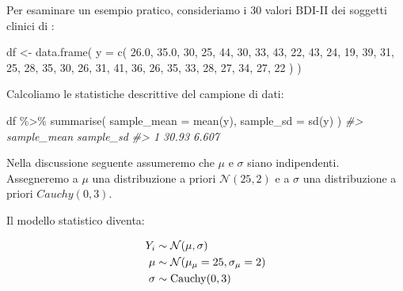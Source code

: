 \documentclass[
  11pt,
]{krantz}
\makeatletter
\newenvironment{Shaded}{\begin{snugshade}}{\end{snugshade}}
\newcommand{\AttributeTok}[1]{\textcolor[rgb]{0.61,0.61,0.61}{#1}}
\newcommand{\CommentTok}[1]{\textcolor[rgb]{0.37,0.37,0.37}{\textit{#1}}}
\newcommand{\DecValTok}[1]{\textcolor[rgb]{0.06,0.06,0.06}{#1}}
\newcommand{\FloatTok}[1]{\textcolor[rgb]{0.06,0.06,0.06}{#1}}
\newcommand{\FunctionTok}[1]{\textcolor[rgb]{0,0,0}{#1}}
\newcommand{\NormalTok}[1]{#1}
\newcommand{\OtherTok}[1]{\textcolor[rgb]{0.37,0.37,0.37}{#1}}
\newcommand{\SpecialCharTok}[1]{\textcolor[rgb]{0,0,0}{#1}}
\newenvironment{kframe}{%
\medskip{}
\setlength{\fboxsep}{.8em}
 \def\at@end@of@kframe{}%
 \ifinner\ifhmode%
  \def\at@end@of@kframe{\end{minipage}}%
  \begin{minipage}{\columnwidth}%
 \fi\fi%
 \def\FrameCommand##1{\hskip\@totalleftmargin \hskip-\fboxsep
 \colorbox{shadecolor}{##1}\hskip-\fboxsep
     \hskip-\linewidth \hskip-\@totalleftmargin \hskip\columnwidth}%
 \MakeFramed {\advance\hsize-\width
   \@totalleftmargin\z@ \linewidth\hsize
   \@setminipage}}%
 {\par\unskip\endMakeFramed%
 \at@end@of@kframe}
\renewenvironment{Shaded}{\begin{kframe}}{\end{kframe}}
\DeclareMathOperator{\Cauchy}{Cauchy} %
\theoremstyle{definition}
\theoremstyle{definition}
\theoremstyle{definition}
\theoremstyle{definition}
\theoremstyle{remark}
\makeatother
\begin{document}
Per esaminare un esempio pratico, consideriamo i 30 valori BDI-II dei soggetti clinici di \citet{zetschefuture2019}:

\begin{Shaded}
\begin{Highlighting}[]
\NormalTok{df }\OtherTok{\textless{}{-}} \FunctionTok{data.frame}\NormalTok{(}
  \AttributeTok{y =} \FunctionTok{c}\NormalTok{(}
    \FloatTok{26.0}\NormalTok{, }\FloatTok{35.0}\NormalTok{, }\DecValTok{30}\NormalTok{, }\DecValTok{25}\NormalTok{, }\DecValTok{44}\NormalTok{, }\DecValTok{30}\NormalTok{, }\DecValTok{33}\NormalTok{, }\DecValTok{43}\NormalTok{, }\DecValTok{22}\NormalTok{, }\DecValTok{43}\NormalTok{,}
    \DecValTok{24}\NormalTok{, }\DecValTok{19}\NormalTok{, }\DecValTok{39}\NormalTok{, }\DecValTok{31}\NormalTok{, }\DecValTok{25}\NormalTok{, }\DecValTok{28}\NormalTok{, }\DecValTok{35}\NormalTok{, }\DecValTok{30}\NormalTok{, }\DecValTok{26}\NormalTok{, }\DecValTok{31}\NormalTok{, }\DecValTok{41}\NormalTok{,}
    \DecValTok{36}\NormalTok{, }\DecValTok{26}\NormalTok{, }\DecValTok{35}\NormalTok{, }\DecValTok{33}\NormalTok{, }\DecValTok{28}\NormalTok{, }\DecValTok{27}\NormalTok{, }\DecValTok{34}\NormalTok{, }\DecValTok{27}\NormalTok{, }\DecValTok{22}
\NormalTok{  )}
\NormalTok{)}
\end{Highlighting}
\end{Shaded}

Calcoliamo le statistiche descrittive del campione di dati:

\begin{Shaded}
\begin{Highlighting}[]
\NormalTok{df }\SpecialCharTok{\%\textgreater{}\%} 
  \FunctionTok{summarise}\NormalTok{(}
    \AttributeTok{sample\_mean =} \FunctionTok{mean}\NormalTok{(y),}
    \AttributeTok{sample\_sd =} \FunctionTok{sd}\NormalTok{(y)}
\NormalTok{  )}
\CommentTok{\#\textgreater{}   sample\_mean sample\_sd}
\CommentTok{\#\textgreater{} 1       30.93     6.607}
\end{Highlighting}
\end{Shaded}

Nella discussione seguente assumeremo che \(\mu\) e \(\sigma\) siano indipendenti. Assegneremo a \(\mu\) una distribuzione a priori \(\mathcal{N}(25, 2)\) e a \(\sigma\) una distribuzione a priori \(Cauchy(0, 3)\).

Il modello statistico diventa:

\begin{align}
Y_i &\sim \mathcal{N}(\mu, \sigma) \notag\\
\mu &\sim \mathcal{N}(\mu_{\mu} = 25, \sigma_{\mu} = 2) \notag\\
\sigma &\sim \Cauchy(0, 3) \notag
\end{align}
\end{document}
